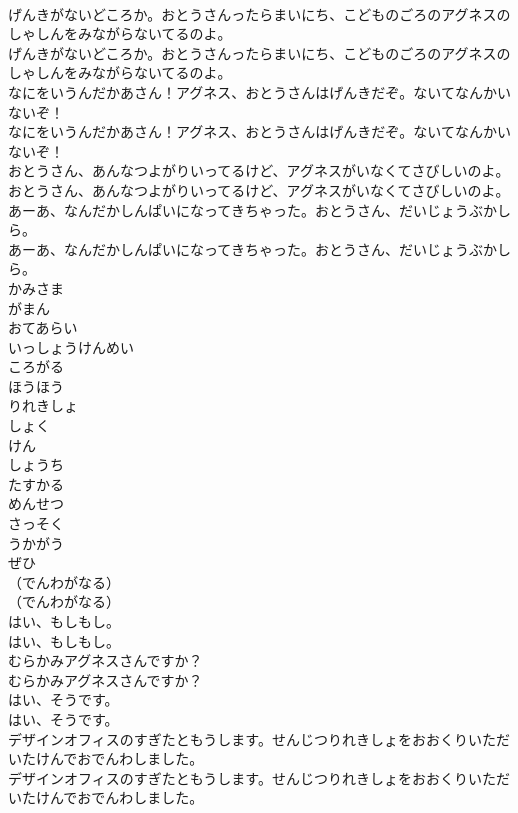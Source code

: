\documentclass[8pt]{extreport}
\begin{document}
\begin{CJK}{UTF8}{min}
\\	げんきがないどころか。おとうさんったらまいにち、こどものごろのアグネスのしゃしんをみながらないてるのよ。	
\\	げんきがないどころか。おとうさんったらまいにち、こどものごろのアグネスのしゃしんをみながらないてるのよ。 
\\	なにをいうんだかあさん！アグネス、おとうさんはげんきだぞ。ないてなんかいないぞ！	
\\	なにをいうんだかあさん！アグネス、おとうさんはげんきだぞ。ないてなんかいないぞ！ 
\\	おとうさん、あんなつよがりいってるけど、アグネスがいなくてさびしいのよ。	
\\	おとうさん、あんなつよがりいってるけど、アグネスがいなくてさびしいのよ。 
\\	あーあ、なんだかしんぱいになってきちゃった。おとうさん、だいじょうぶかしら。	
\\	あーあ、なんだかしんぱいになってきちゃった。おとうさん、だいじょうぶかしら。 
\\	かみさま
\\	がまん
\\	おてあらい
\\	いっしょうけんめい
\\	ころがる
\\	ほうほう
\\	りれきしょ
\\	しょく
\\	けん
\\	しょうち
\\	たすかる
\\	めんせつ
\\	さっそく
\\	うかがう
\\	ぜひ
\\	（でんわがなる）	
\\	（でんわがなる） 
\\	はい、もしもし。	
\\	はい、もしもし。 
\\	むらかみアグネスさんですか？	
\\	むらかみアグネスさんですか？ 
\\	はい、そうです。	
\\	はい、そうです。 
\\	デザインオフィスのすぎたともうします。せんじつりれきしょをおおくりいただいたけんでおでんわしました。	
\\	デザインオフィスのすぎたともうします。せんじつりれきしょをおおくりいただいたけんでおでんわしました。 

\end{CJK}
\end{document}
